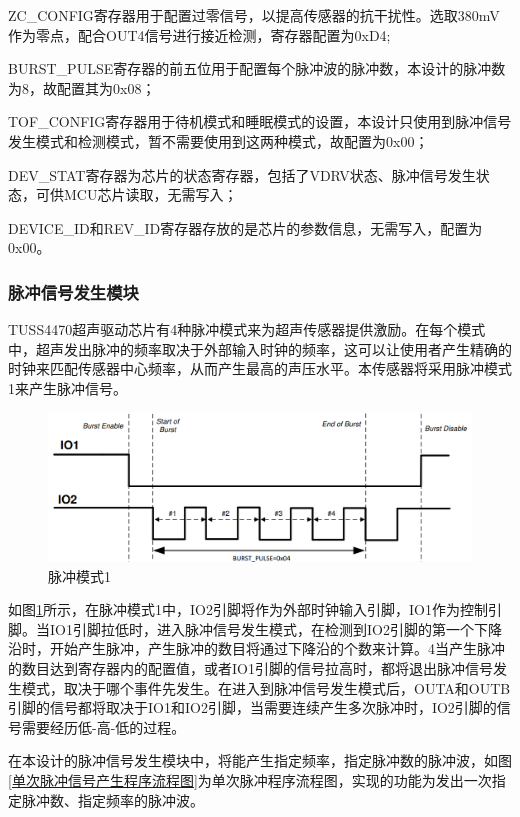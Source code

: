 ZC\_CONFIG寄存器用于配置过零信号，以提高传感器的抗干扰性。选取380mV作为零点，配合OUT4信号进行接近检测，寄存器配置为0xD4;\par
BURST\_PULSE寄存器的前五位用于配置每个脉冲波的脉冲数，本设计的脉冲数为8，故配置其为0x08；\par
TOF\_CONFIG寄存器用于待机模式和睡眠模式的设置，本设计只使用到脉冲信号发生模式和检测模式，暂不需要使用到这两种模式，故配置为0x00；\par
DEV\_STAT寄存器为芯片的状态寄存器，包括了VDRV状态、脉冲信号发生状态，可供MCU芯片读取，无需写入；\par
DEVICE\_ID和REV\_ID寄存器存放的是芯片的参数信息，无需写入，配置为0x00。

\subsubsection{脉冲信号发生模块}
TUSS4470超声驱动芯片有4种脉冲模式来为超声传感器提供激励。在每个模式中，超声发出脉冲的频率取决于外部输入时钟的频率，这可以让使用者产生精确的时钟来匹配传感器中心频率，从而产生最高的声压水平。本传感器将采用脉冲模式1来产生脉冲信号。\par
\newpage
\begin{figure}[!h]
	\centering
	\includegraphics[width=12cm]{figure/IO MODE1.png}
	\caption{脉冲模式1}
	\label{脉冲模式1}
\end{figure}\par
如图\ref{脉冲模式1}所示，在脉冲模式1中，IO2引脚将作为外部时钟输入引脚，IO1作为控制引脚。当IO1引脚拉低时，进入脉冲信号发生模式，在检测到IO2引脚的第一个下降沿时，开始产生脉冲，产生脉冲的数目将通过下降沿的个数来计算。4当产生脉冲的数目达到寄存器内的配置值，或者IO1引脚的信号拉高时，都将退出脉冲信号发生模式，取决于哪个事件先发生。在进入到脉冲信号发生模式后，OUTA和OUTB引脚的信号都将取决于IO1和IO2引脚，当需要连续产生多次脉冲时，IO2引脚的信号需要经历低-高-低的过程。

在本设计的脉冲信号发生模块中，将能产生指定频率，指定脉冲数的脉冲波，如图\ref{单次脉冲信号产生程序流程图}为单次脉冲程序流程图，实现的功能为发出一次指定脉冲数、指定频率的脉冲波。



